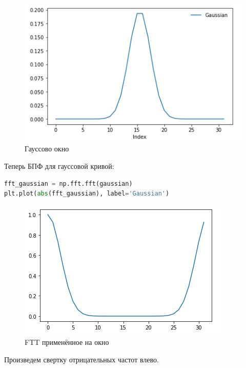 \begin{figure}[H]
	\begin{center}
		\includegraphics[scale=0.7]{fig/lab08/lab08_04.png}
		\caption{Гауссово окно}
	\end{center}
\end{figure}

Теперь БПФ для гауссовой кривой:

\begin{lstlisting}[language=Python]
fft_gaussian = np.fft.fft(gaussian)
plt.plot(abs(fft_gaussian), label='Gaussian')
\end{lstlisting}
\begin{figure}[H]
	\begin{center}
		\includegraphics[scale=1]{fig/lab08/lab08_05.png}
		\caption{FTT применённое на окно}
	\end{center}
\end{figure}

Произведем свертку отрицательных частот влево.

